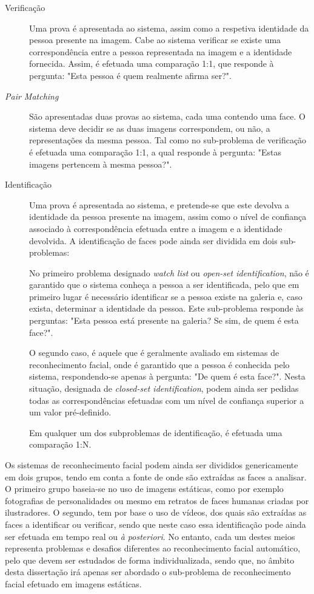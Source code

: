 \begin{description}
\item[Verificação] Uma prova é apresentada ao sistema, assim como a respetiva identidade da pessoa presente na imagem. Cabe ao sistema verificar se existe uma correspondência entre a pessoa representada na imagem e a identidade fornecida. Assim, é efetuada uma comparação 1:1, que responde à pergunta: "Esta pessoa é quem realmente afirma ser?".

\item[\textit{Pair Matching}] São apresentadas duas provas ao sistema, cada uma contendo uma face. O sistema deve decidir se as duas imagens correspondem, ou não, a representações da mesma pessoa. Tal como no sub-problema de verificação é efetuada uma comparação 1:1, a qual responde à pergunta: "Estas imagens pertencem à mesma pessoa?".

\item[Identificação] Uma prova é apresentada ao sistema, e pretende-se que este devolva a identidade da pessoa presente na imagem, assim como o nível de confiança associado à correspondência efetuada entre a imagem e a identidade devolvida. A identificação de faces pode ainda ser dividida em dois sub-problemas: 

No primeiro problema designado \textit{watch list} ou \textit{open-set identification}\cite{Chellappa2010}, não é garantido que o sistema conheça a pessoa a ser identificada, pelo que em primeiro lugar é necessário identificar se a pessoa existe na galeria e, caso exista, determinar a identidade da pessoa. Este sub-problema responde às perguntas: "Esta pessoa está presente na galeria? Se sim, de quem é esta face?". 

O segundo caso, é aquele que é geralmente avaliado em sistemas de reconhecimento facial, onde é garantido que a pessoa é conhecida pelo sistema, respondendo-se apenas à pergunta: "De quem é esta face?". Nesta situação, designada de \textit{closed-set identification}, podem ainda ser pedidas todas as correspondências efetuadas com um nível de confiança superior a um valor pré-definido. 

Em qualquer um dos subproblemas de identificação, é efetuada uma comparação 1:N.
\end{description}

Os sistemas de reconhecimento facial podem ainda ser divididos genericamente em dois grupos, tendo em conta a fonte de onde são extraídas as faces a analisar. O primeiro grupo baseia-se no uso de imagens estáticas, como por exemplo fotografias de personalidades ou mesmo em retratos de faces humanas criadas por ilustradores. O segundo, tem por base o uso de vídeos, dos quais são extraídas as faces a identificar ou verificar, sendo que neste caso essa identificação pode ainda ser efetuada em tempo real ou \textit{à posteriori}. No entanto, cada um destes meios representa problemas e desafios diferentes ao reconhecimento facial automático, pelo que devem ser estudados de forma individualizada, sendo que, no âmbito desta dissertação irá apenas ser abordado o sub-problema de reconhecimento facial efetuado em imagens estáticas.

